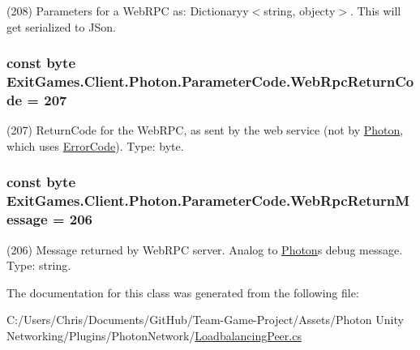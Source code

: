 (208) Parameters for a Web\+R\+PC as\+: Dictionaryy$<$string, objecty$>$. This will get serialized to J\+Son.

\subsubsection[{\texorpdfstring{Web\+Rpc\+Return\+Code}{WebRpcReturnCode}}]{\setlength{\rightskip}{0pt plus 5cm}const byte Exit\+Games.\+Client.\+Photon.\+Parameter\+Code.\+Web\+Rpc\+Return\+Code = 207}\hypertarget{class_exit_games_1_1_client_1_1_photon_1_1_parameter_code_afee06b263ad9c6f084efb578b4e29bd5}{}\label{class_exit_games_1_1_client_1_1_photon_1_1_parameter_code_afee06b263ad9c6f084efb578b4e29bd5}


(207) Return\+Code for the Web\+R\+PC, as sent by the web service (not by \hyperlink{namespace_exit_games_1_1_client_1_1_photon}{Photon}, which uses \hyperlink{class_exit_games_1_1_client_1_1_photon_1_1_error_code}{Error\+Code}). Type\+: byte.

\subsubsection[{\texorpdfstring{Web\+Rpc\+Return\+Message}{WebRpcReturnMessage}}]{\setlength{\rightskip}{0pt plus 5cm}const byte Exit\+Games.\+Client.\+Photon.\+Parameter\+Code.\+Web\+Rpc\+Return\+Message = 206}\hypertarget{class_exit_games_1_1_client_1_1_photon_1_1_parameter_code_acb800c4d8182c1f318eac4fe788cd9f6}{}\label{class_exit_games_1_1_client_1_1_photon_1_1_parameter_code_acb800c4d8182c1f318eac4fe788cd9f6}


(206) Message returned by Web\+R\+PC server. Analog to \hyperlink{namespace_exit_games_1_1_client_1_1_photon}{Photon}\textquotesingle{}s debug message. Type\+: string.



The documentation for this class was generated from the following file\+:\begin{DoxyCompactItemize}
\item 
C\+:/\+Users/\+Chris/\+Documents/\+Git\+Hub/\+Team-\/\+Game-\/\+Project/\+Assets/\+Photon Unity Networking/\+Plugins/\+Photon\+Network/\hyperlink{_loadbalancing_peer_8cs}{Loadbalancing\+Peer.\+cs}\end{DoxyCompactItemize}
